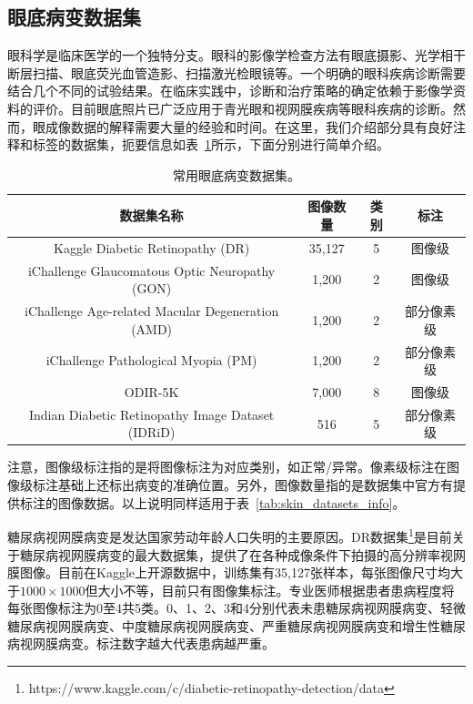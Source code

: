\subsection{眼底病变数据集}\label{subsec:original_dr_dataset_intro}
眼科学是临床医学的一个独特分支。眼科的影像学检查方法有眼底摄影、光学相干断层扫描、眼底荧光血管造影、扫描激光检眼镜等。一个明确的眼科疾病诊断需要结合几个不同的试验结果。在临床实践中，诊断和治疗策略的确定依赖于影像学资料的评价。目前眼底照片已广泛应用于青光眼和视网膜疾病等眼科疾病的诊断。然而，眼成像数据的解释需要大量的经验和时间。在这里，我们介绍部分具有良好注释和标签的数据集，扼要信息如表~\ref{tab:datasets_info}所示，下面分别进行简单介绍。
\begin{table}[h]
	\centering
	\caption{常用眼底病变数据集。}		
	\label{tab:datasets_info}
	\begin{tabular}{c|c|c|c}
		\toprule[2pt]
		数据集名称 & 图像数量 & 类别 & 标注 \\
		\midrule[2pt]
		Kaggle Diabetic Retinopathy (DR)	& 35,127	& 5	&图像级 \\
		\hline                         
		iChallenge Glaucomatous Optic Neuropathy (GON)    & 1,200    & 2 & 图像级 \\ \hline
		iChallenge Age-related Macular Degeneration (AMD) & 1,200    & 2 & 部分像素级 \\ \hline
		iChallenge Pathological Myopia (PM)               & 1,200    & 2 & 部分像素级 \\ \hline
		ODIR-5K & 7,000 & 8 & 图像级 \\ \hline
		
		Indian Diabetic Retinopathy Image Dataset (IDRiD) & 516 & 5 & 部分像素级 \\
		\bottomrule[2pt]
	\end{tabular}
\end{table}

注意，图像级标注指的是将图像标注为对应类别，如正常/异常。像素级标注在图像级标注基础上还标出病变的准确位置。另外，图像数量指的是数据集中官方有提供标注的图像数据。以上说明同样适用于表~\ref{tab:skin_datasets_info}。

糖尿病视网膜病变是发达国家劳动年龄人口失明的主要原因。DR数据集\footnote{https://www.kaggle.com/c/diabetic-retinopathy-detection/data}是目前关于糖尿病视网膜病变的最大数据集，提供了在各种成像条件下拍摄的高分辨率视网膜图像。目前在Kaggle上开源数据中，训练集有35,127张样本，每张图像尺寸均大于$1000\times 1000$但大小不等，目前只有图像集标注。专业医师根据患者患病程度将每张图像标注为0至4共5类。0、1、2、3和4分别代表未患糖尿病视网膜病变、轻微糖尿病视网膜病变、中度糖尿病视网膜病变、严重糖尿病视网膜病变和增生性糖尿病视网膜病变。标注数字越大代表患病越严重。

